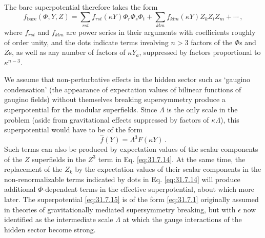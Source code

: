 The bare superpotential therefore takes the form
\begin{equation}
  f_{\mathrm{bare}}(\Phi,Y,Z)
  =\sum_{rst}f_{rst}(\kappa Y)\Phi_r\Phi_s\Phi_t
   +\sum_{klm}f_{klm}(\kappa Y)Z_kZ_lZ_m+\cdots\,,
  \tag{31.7.14}\label{eq:31.7.14}
\end{equation}
where \(f_{rst}\) and \(f_{klm}\) are power series in their arguments with
coefficients roughly of order unity, and the dots indicate terms involving
\(n>3\) factors of the \(\Phi\)s and \(Z\)s, as well as any number of
factors of \(\kappa Y_a\), suppressed by factors proportional to
\(\kappa^{n-3}\).

We assume that non-perturbative effects in the hidden sector such as
`gaugino condensation' (the appearance of expectation values of bilinear
functions of gaugino fields) without themselves breaking supersymmetry
produce a superpotential for the modular superfields. Since \(\Lambda\) is
the only scale in the problem (aside from gravitational effects suppressed
by factors of \(\kappa\Lambda\)), this superpotential would have to be of
the form
\begin{equation}
  \widehat f(Y)=\Lambda^3F(\kappa Y)\,.
  \tag{31.7.15}\label{eq:31.7.15}
\end{equation}
Such terms can also be produced by expectation values of the scalar
components of the \(Z\) superfields in the \(Z^3\) term in
Eq. \eqref{eq:31.7.14}. At the same time, the replacement of the \(Z_k\) by
the expectation values of their scalar components in the non-renormalizable
terms indicated by dots in Eq. \eqref{eq:31.7.14} will produce additional
\(\Phi\)-dependent terms in the effective superpotential, about which more
later. The superpotential \eqref{eq:31.7.15} is of the form
\eqref{eq:31.7.1} originally assumed in theories of gravitationally
mediated supersymmetry breaking, but with \(\epsilon\) now identified as the
intermediate scale \(\Lambda\) at which the gauge interactions of the
hidden sector become strong.

